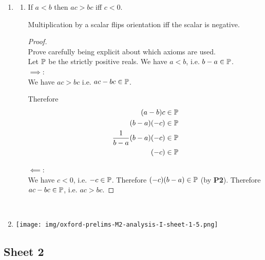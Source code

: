 \begin{enumerate}
\item
  \begin{enumerate}[label=(\alph*)]
  \item
    \newpage
    \begin{theorem*}
      If $a < b$ then $ac > bc$ iff $c < 0$.
    \end{theorem*}
    \begin{intuition*}
      Multiplication by a scalar flips orientation iff the scalar is negative.
    \end{intuition*}
    \begin{proof}~\\
       Prove carefully being explicit about which axioms are used.\\
      Let $\P$ be the strictly positive reals. We have $a < b$, i.e. $b - a \in \P$.\\
      $\implies$:\\
      We have $ac > bc$ i.e. $ac - bc \in \P$.

      Therefore
      \begin{align*}
        (a - b)c &\in \P\\
        (b - a)(-c) &\in \P\\
        \frac{1}{b-a}(b - a)(-c) &\in \P\\
        (-c) &\in \P
      \end{align*}

      $\impliedby$:\\
      We have $c < 0$, i.e. $-c \in \P$. Therefore $(-c)(b - a) \in \P$ (by {\bf P2}). Therefore
      $ac - bc \in \P$, i.e. $ac > bc$.
    \end{proof}
  \end{enumerate}~\\
\item

  \begin{mdframed}
    \texttt{[image: img/oxford-prelims-M2-analysis-I-sheet-1-5.png]}
  \end{mdframed}
\end{enumerate}

\newpage
\subsection{Sheet 2}


